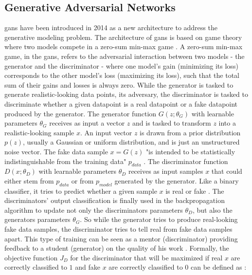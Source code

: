 \newpage %
\subsection{Generative Adversarial Networks}
\label{ch:preliminaries-generativeAdversarialNetworks}

\Glspl{gan} \cite{NIPS2014_5ca3e9b1} have been introduced in 2014 as a new architecture to address the generative modeling problem.
The architecture of \glspl{gan} is based on game theory where two models compete in a zero-sum min-max game \cite{NIPS2014_5ca3e9b1, zhao2022CTABGANEnhancingTabular}.
A zero-sum min-max game, in the \glspl{gan}, refers to the adversarial interaction between two models - the generator and the discriminator - where one model's gain (minimizing its loss) corresponds to the other model's loss (maximizing its loss), such that the total sum of their gains and losses is always zero.
While the generator is tasked to generate realistic-looking data points, its adversary, the discriminator is tasked to discriminate whether a given datapoint is a real datapoint or a fake datapoint produced by the generator.
The generator function $G(z;\theta_G)$ with learnable parameters $\theta_G$ receives as input a vector $z$ and is tasked to transform $z$ into a realistic-looking sample $x$.
An input vector $z$ is drawn from a prior distribution $p(z)$, usually a Gaussian or uniform distribution, and is just an unstructured noise vector.
The fake data sample $x=G(z)$ "is intended to be statistically indistinguishable from the training data" $p_{data}$ \cite[p. 141]{goodfellow2020GenerativeAdversarialNetworks}.
The discriminator function $D(x;\theta_D)$ with learnable parameters $\theta_D$ receives as input samples $x$ that could either stem from $p_{data}$ or from $p_{model}$ generated by the generator.
Like a binary classifier, it tries to predict whether a given sample $x$ is real or fake \cite{NIPS2014_5ca3e9b1}.
The discriminators' output classification is finally used in the backpropagation algorithm to update not only the discriminators parameters $\theta_D$, but also the generators parameters $\theta_G$.
So while the generator tries to produce real-looking fake data samples, the discriminator tries to tell real from fake data samples apart. 
This type of training can be seen as a mentor (discriminator) providing feedback to a student (generator) on the quality of his work \cite{zhao2022CTABGANEnhancingTabular}.
Formally, the objective function $J_D$ for the discriminator that will be maximized if real $x$ are correctly classified to $1$ and fake $x$ are correctly classified to $0$ can be defined as \cite{aggarwal2018NeuralNetworksDeep}:

